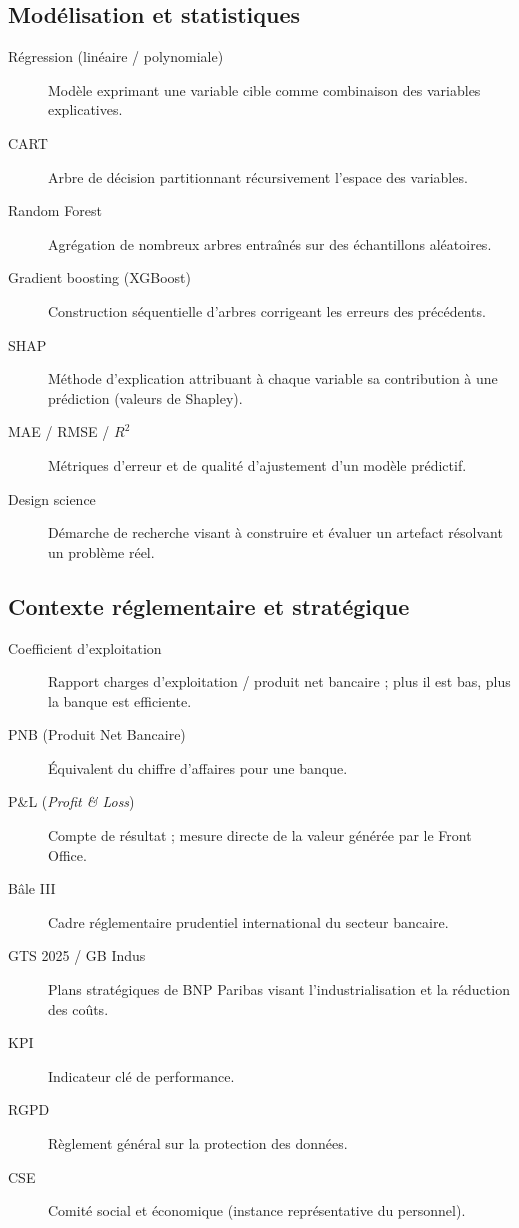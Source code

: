 \subsection*{Modélisation et statistiques}
\begin{description}
  \item[Régression (linéaire / polynomiale)] Modèle exprimant une variable cible comme combinaison des variables explicatives.
  \item[CART] Arbre de décision partitionnant récursivement l'espace des variables.
  \item[Random Forest] Agrégation de nombreux arbres entraînés sur des échantillons aléatoires.
  \item[Gradient boosting (XGBoost)] Construction séquentielle d'arbres corrigeant les erreurs des précédents.
  \item[SHAP] Méthode d'explication attribuant à chaque variable sa contribution à une prédiction (valeurs de Shapley).
  \item[MAE / RMSE / $R^2$] Métriques d'erreur et de qualité d'ajustement d'un modèle prédictif.
  \item[Design science] Démarche de recherche visant à construire et évaluer un artefact résolvant un problème réel.
\end{description}

\subsection*{Contexte réglementaire et stratégique}
\begin{description}
  \item[Coefficient d'exploitation] Rapport charges d'exploitation / produit net bancaire ; plus il est bas, plus la banque est efficiente.
  \item[PNB (Produit Net Bancaire)] Équivalent du chiffre d'affaires pour une banque.
  \item[P\&L (\textit{Profit \& Loss})] Compte de résultat ; mesure directe de la valeur générée par le Front Office.
  \item[Bâle III] Cadre réglementaire prudentiel international du secteur bancaire.
  \item[GTS 2025 / GB Indus] Plans stratégiques de BNP Paribas visant l'industrialisation et la réduction des coûts.
  \item[KPI] Indicateur clé de performance.
  \item[RGPD] Règlement général sur la protection des données.
  \item[CSE] Comité social et économique (instance représentative du personnel).
\end{description}

